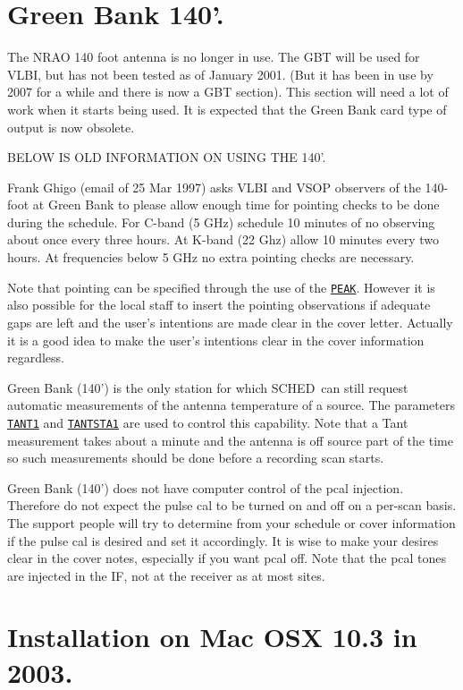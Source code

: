 \documentclass{report}
\newcommand{\schedb}{{\sc SCHED~}}
\begin{document}
\section{\label{SSEC:GB}Green Bank 140'.}

The NRAO 140 foot antenna is no longer in use.  The GBT will be used
for VLBI, but has not been tested as of January 2001. (But it has been
in use by 2007 for a while and there is now a GBT section).  This section
will need a lot of work when it starts being used.  It is expected
that the Green Bank card type of output is now obsolete.

BELOW IS OLD INFORMATION ON USING THE 140'.

Frank Ghigo (email of 25 Mar 1997) asks VLBI and VSOP observers of
the 140-foot at Green Bank to please allow enough time for pointing
checks to be done during the schedule.  For C-band (5 GHz) schedule 10
minutes of no observing about once every three hours.  At K-band (22
Ghz) allow 10 minutes every two hours.  At frequencies below 5 GHz no
extra pointing checks are necessary.

Note that pointing can be specified through the use of the
{\hyperref[MP:PEAK]{{\tt PEAK}}}.  However it is also possible for the
local staff to insert the pointing observations if adequate gaps
are left and the user's intentions are made clear in the cover
letter.  Actually it is a good idea to make the user's intentions
clear in the cover information regardless.

Green Bank (140') is the only station for which \schedb can still
request automatic measurements of the antenna temperature of a
source.  The parameters 
{\hyperref[MP:TANT1]{{\tt TANT1}}} and
{\hyperref[MP:TANTSTA1]{{\tt TANTSTA1}}} are used to control this
capability.  Note that a Tant measurement takes about a minute
and the antenna is off source part of the time so such measurements
should be done before a recording scan starts.

Green Bank (140') does not have computer control of the pcal
injection.  Therefore do not expect the pulse cal to be turned on and
off on a per-scan basis.  The support people will try to determine
from your schedule or cover information if the pulse cal is desired
and set it accordingly.  It is wise to make your desires clear in the
cover notes, especially if you want pcal off.  Note that the pcal
tones are injected in the IF, not at the receiver as at most sites.


\section{\label{APP:Mac2003}Installation on Mac OSX 10.3 in 2003.}
\end{document}
